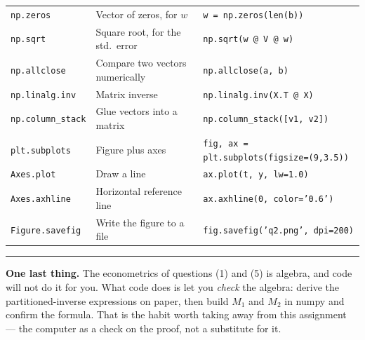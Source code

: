 \documentclass[11pt]{article}
\newcommand{\code}[1]{\texttt{#1}}
\begin{document}
\begin{center}
\begin{longtable}{@{}p{4.2cm}p{4.8cm}p{6.5cm}@{}}
\code{np.zeros} & Vector of zeros, for $w$ & \code{w = np.zeros(len(b))} \\
\code{np.sqrt} & Square root, for the std.\ error & \code{np.sqrt(w @ V @ w)} \\
\code{np.allclose} & Compare two vectors numerically & \code{np.allclose(a, b)} \\
\code{np.linalg.inv} & Matrix inverse & \code{np.linalg.inv(X.T @ X)} \\
\code{np.column\_stack} & Glue vectors into a matrix & \code{np.column\_stack([v1, v2])} \\
\code{plt.subplots} & Figure plus axes & \code{fig, ax = plt.subplots(figsize=(9,3.5))} \\
\code{Axes.plot} & Draw a line & \code{ax.plot(t, y, lw=1.0)} \\
\code{Axes.axhline} & Horizontal reference line & \code{ax.axhline(0, color='0.6')} \\
\code{Figure.savefig} & Write the figure to a file & \code{fig.savefig('q2.png', dpi=200)} \\
\bottomrule
\end{longtable}
\end{center}

\vspace{1.2em}
\hrule\vspace{0.5em}
{\small \noindent\textbf{One last thing.} The econometrics of questions (1) and
(5) is algebra, and code will not do it for you. What code does is let you
\emph{check} the algebra: derive the partitioned-inverse expressions on paper,
then build $M_1$ and $M_2$ in numpy and confirm the formula. That is the habit
worth taking away from this assignment --- the computer as a check on the
proof, not a substitute for it.}
\end{document}
